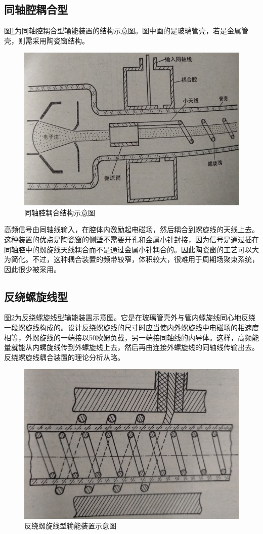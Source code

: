 \subsection{同轴腔耦合型}
图\ref{ch9-3}为同轴腔耦合型输能装置的结构示意图。图中画的是玻璃管壳，若是金属管壳，则需采用陶瓷窗结构。
\begin{figure}[phtb]
	\centering
	\includegraphics[width=0.75\linewidth]{figure/ch9-3}
	\caption{ 同轴腔耦合结构示意图}
	\label{ch9-3}
\end{figure}

高频信号由同轴线输入，在腔体内激励起电磁场，然后耦合到螺旋线的天线上去。这种装置的优点是陶瓷窗的侧壁不需要开孔和金属小针封接，因为信号是通过插在同轴腔中的螺旋线天线耦合而不是通过金属小针耦合的。因此陶瓷窗的工艺可以大为简化。不过，这种耦合装置的频带较窄，体积较大，很难用于周期场聚束系统，因此很少被采用。

\subsection{反绕螺旋线型}
图\ref{ch9-4}为反绕螺旋线型输能装置示意图。它是在玻璃管壳外与管内螺旋线同心地反绕一段螺旋线构成的。设计反绕螺旋线的尺寸时应当使内外螺旋线中电磁场的相速度相等，外螺旋线的一端接以50欧姆负载，另一端接同轴线的内导体。这样，高频能量就能从内螺旋线传到外螺旋线上去，然后再由连接外螺旋线的同轴线传输出去。反绕螺旋线耦合装置的理论分析从略。
\begin{figure}[phtb]
	\centering
	\includegraphics[width=0.75\linewidth]{figure/ch9-4}
	\caption{ 反绕螺旋线型输能装置示意图}
	\label{ch9-4}
\end{figure}


